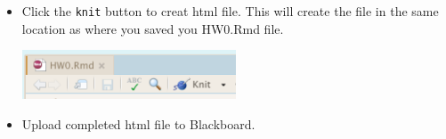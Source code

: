 \documentclass[12pt]{article}
\begin{document}
\begin{itemize}
\item
  Click the \texttt{knit} button to creat html file. This will create
  the file in the same location as where you saved you HW0.Rmd file.

  \includegraphics[width=0.5\textwidth,height=\textheight]{R-knit.png}
\item
  Upload completed html file to Blackboard.
\end{itemize}
\end{document}
